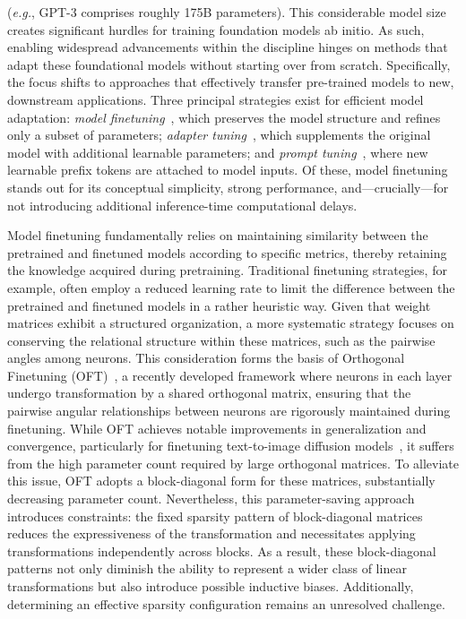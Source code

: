 (\emph{e.g.}, GPT-3 comprises roughly 175B parameters). This considerable model size creates significant hurdles for training foundation models ab initio. As such, enabling widespread advancements within the discipline hinges on methods that adapt these foundational models without starting over from scratch. Specifically, the focus shifts to approaches that effectively transfer pre-trained models to new, downstream applications. Three principal strategies exist for efficient model adaptation: \emph{model finetuning}~\cite{hulora2022,zaken2022bitfit,guo2020parameter,raffel2020exploring,qiu2023controlling,zhang2022adaptive,chavan2023one}, which preserves the model structure and refines only a subset of parameters; \emph{adapter tuning}~\cite{rebuffi2017learning,houlsby2019parameter,pfeiffer2020adapterfusion,lin2020exploring,he2021towards}, which supplements the original model with additional learnable parameters; and \emph{prompt tuning}~\cite{li2021prefix,lester2021power}, where new learnable prefix tokens are attached to model inputs. Of these, model finetuning stands out for its conceptual simplicity, strong performance, and—crucially—for not introducing additional inference-time computational delays.

Model finetuning fundamentally relies on maintaining similarity between the pretrained and finetuned models according to specific metrics, thereby retaining the knowledge acquired during pretraining. Traditional finetuning strategies, for example, often employ a reduced learning rate to limit the difference between the pretrained and finetuned models in a rather heuristic way. Given that weight matrices exhibit a structured organization, a more systematic strategy focuses on conserving the relational structure within these matrices, such as the pairwise angles among neurons. This consideration forms the basis of Orthogonal Finetuning (OFT)~\cite{qiu2023controlling}, a recently developed framework where neurons in each layer undergo transformation by a shared orthogonal matrix, ensuring that the pairwise angular relationships between neurons are rigorously maintained during finetuning. While OFT achieves notable improvements in generalization and convergence, particularly for finetuning text-to-image diffusion models~\cite{qiu2023controlling}, it suffers from the high parameter count required by large orthogonal matrices. To alleviate this issue, OFT adopts a block-diagonal form for these matrices, substantially decreasing parameter count. Nevertheless, this parameter-saving approach introduces constraints: the fixed sparsity pattern of block-diagonal matrices reduces the expressiveness of the transformation and necessitates applying transformations independently across blocks. As a result, these block-diagonal patterns not only diminish the ability to represent a wider class of linear transformations but also introduce possible inductive biases. Additionally, determining an effective sparsity configuration remains an unresolved challenge.

